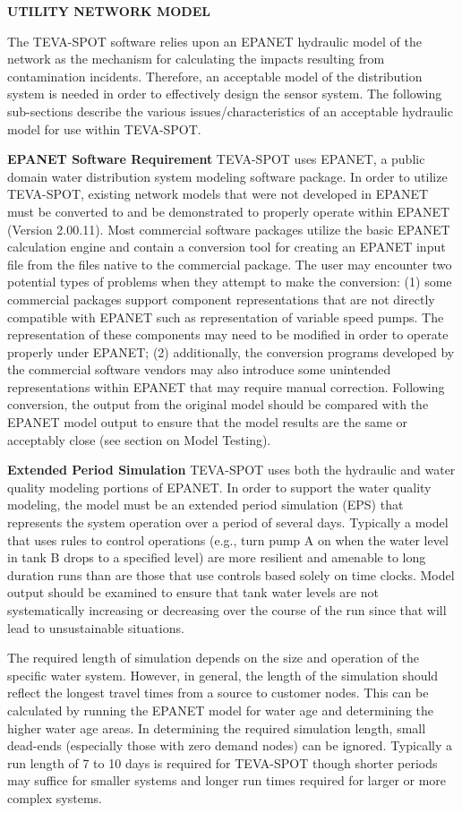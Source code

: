{\bf UTILITY NETWORK MODEL}

The TEVA-SPOT software relies upon an EPANET hydraulic model of the network as the mechanism for calculating the impacts resulting from contamination incidents. Therefore, an acceptable model of the distribution system is needed in order to effectively design the sensor system. The following sub-sections describe the various issues/characteristics of an acceptable hydraulic model for use within TEVA-SPOT.   

{\bf EPANET Software Requirement}
TEVA-SPOT uses EPANET, a public domain water distribution system modeling software package. In order to utilize TEVA-SPOT, existing network models that were not developed in EPANET must be converted to and be demonstrated to properly operate within EPANET (Version 2.00.11). Most commercial software packages utilize the basic EPANET calculation engine and contain a conversion tool for creating an EPANET input file from the files native to the commercial package.  The user may encounter two potential types of problems when they attempt to make the conversion: (1) some commercial packages support component representations that are not directly compatible with EPANET such as representation of variable speed pumps. The representation of these components may need to be modified in order to operate properly under EPANET; (2) additionally, the conversion programs developed by the commercial software vendors may also introduce some unintended representations within EPANET that may require manual correction.  Following conversion, the output from the original model should be compared with the EPANET model output to ensure that the model results are the same or acceptably close (see section on Model Testing). 

{\bf Extended Period Simulation}
TEVA-SPOT uses both the hydraulic and water quality modeling portions of EPANET. In order to support the water quality modeling, the model must be an extended period simulation (EPS) that represents the system operation over a period of several days. Typically a model that uses rules to control operations (e.g., turn pump A on when the water level in tank B drops to a specified level) are more resilient and amenable to long duration runs than are those that use controls based solely on time clocks. Model output should be examined to ensure that tank water levels are not systematically increasing or decreasing over the course of the run since that will lead to unsustainable situations. 

The required length of simulation depends on the size and operation of the specific water system. However, in general, the length of the simulation should reflect the longest travel times from a source to customer nodes. This can be calculated by running the EPANET model for water age and determining the higher water age areas. In determining the required simulation length, small dead-ends (especially those with zero demand nodes) can be ignored. Typically a run length of 7 to 10 days is required for TEVA-SPOT though shorter periods may suffice for smaller systems and longer run times required for larger or more complex systems. 

